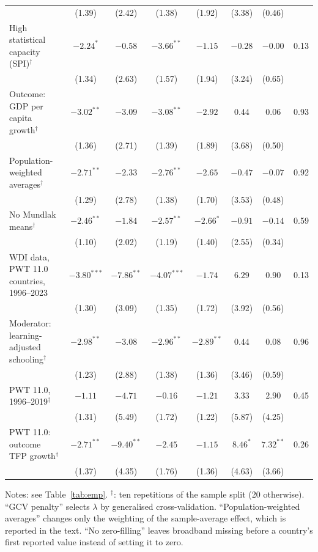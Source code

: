 \documentclass[preprint,12pt,authoryear]{elsarticle}
\begin{document}
\begin{table}[!p]
\begin{threeparttable}
\begin{tabular}{lccccccc}
 & (1.39) & (2.42) & (1.38) & (1.92) & (3.38) & (0.46) & \\
\quad High statistical capacity (SPI)$^{\dagger}$ & $-2.24^{*}$ & $-0.58$ & $-3.66^{**}$ & $-1.15$ & $-0.28$ & $-0.00$ & 0.13\\
 & (1.34) & (2.63) & (1.57) & (1.94) & (3.24) & (0.65) & \\
\quad Outcome: GDP per capita growth$^{\dagger}$ & $-3.02^{**}$ & $-3.09$ & $-3.08^{**}$ & $-2.92$ & $0.44$ & $0.06$ & 0.93\\
 & (1.36) & (2.71) & (1.39) & (1.89) & (3.68) & (0.50) & \\
\quad Population-weighted averages$^{\dagger}$ & $-2.71^{**}$ & $-2.33$ & $-2.76^{**}$ & $-2.65$ & $-0.47$ & $-0.07$ & 0.92\\
 & (1.29) & (2.78) & (1.38) & (1.70) & (3.53) & (0.48) & \\
\quad No Mundlak means$^{\dagger}$ & $-2.46^{**}$ & $-1.84$ & $-2.57^{**}$ & $-2.66^{*}$ & $-0.91$ & $-0.14$ & 0.59\\
 & (1.10) & (2.02) & (1.19) & (1.40) & (2.55) & (0.34) & \\
\quad WDI data, PWT 11.0 countries, 1996--2023 & $-3.80^{***}$ & $-7.86^{**}$ & $-4.07^{***}$ & $-1.74$ & $6.29$ & $0.90$ & 0.13\\
 & (1.30) & (3.09) & (1.35) & (1.72) & (3.92) & (0.56) & \\
\quad Moderator: learning-adjusted schooling$^{\dagger}$ & $-2.98^{**}$ & $-3.08$ & $-2.96^{**}$ & $-2.89^{**}$ & $0.44$ & $0.08$ & 0.96\\
 & (1.23) & (2.88) & (1.38) & (1.36) & (3.46) & (0.59) & \\
\quad PWT 11.0, 1996--2019$^{\dagger}$ & $-1.11$ & $-4.71$ & $-0.16$ & $-1.21$ & $3.33$ & $2.90$ & 0.45\\
 & (1.31) & (5.49) & (1.72) & (1.22) & (5.87) & (4.25) & \\
\quad PWT 11.0: outcome TFP growth$^{\dagger}$ & $-2.71^{**}$ & $-9.40^{**}$ & $-2.45$ & $-1.15$ & $8.46^{*}$ & $7.32^{**}$ & 0.26\\
 & (1.37) & (4.35) & (1.76) & (1.36) & (4.63) & (3.66) & \\
\bottomrule
\end{tabular}
\begin{tablenotes}\scriptsize
\item Notes: see Table~\ref{tab:emp}. $^{\dagger}$: ten repetitions of the sample split (20 otherwise). ``GCV penalty'' selects $\lambda$ by generalised cross-validation. ``Population-weighted averages'' changes only the weighting of the sample-average effect, which is reported in the text. ``No zero-filling'' leaves broadband missing before a country's first reported value instead of setting it to zero.
\end{tablenotes}
\end{threeparttable}
\end{table}
\end{document}
